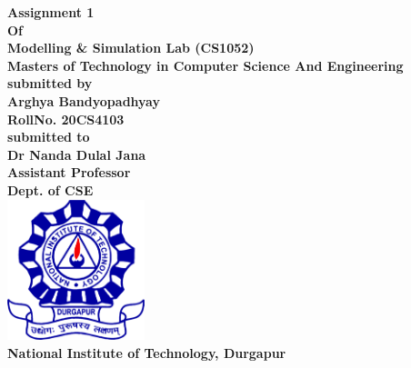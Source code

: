 \documentclass[12pt, letterpaper, twoside]{book}
\date{22nd May 2021}
\begin{document}
\begin{titlepage}
	\begin{center}
       \vspace*{5cm}
       \bfseries\Large
    	Assignment 1\\
    	Of\\
    	Modelling \& Simulation Lab (CS1052)\\
        \vskip1cm
        Masters of Technology in Computer Science And Engineering\\
        \vskip1cm
        submitted by\\
    	Arghya Bandyopadhyay\\
    	RollNo. 20CS4103\\
    	\vskip1cm
    	submitted to\\
    	Dr Nanda Dulal Jana\\
    	Assistant Professor\\
    	Dept. of CSE\\
    	\vskip1cm
    	\includegraphics[width=4cm]{NITDGP}\\
    	National Institute of Technology, Durgapur\\
    \end{center}
\end{titlepage}
\end{document}
